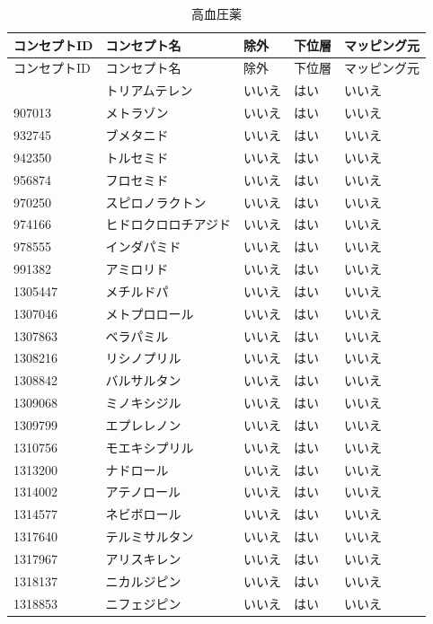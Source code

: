 \documentclass[
  11pt]{book}
\theoremstyle{definition}
\theoremstyle{definition}
\theoremstyle{definition}
\theoremstyle{definition}
\theoremstyle{remark}
\begin{document}
\begin{longtable}[]{@{}lllll@{}}
\caption{\label{tab:htnDrugsAceMono} 高血圧薬}\tabularnewline
\toprule\noalign{}
コンセプトID & コンセプト名 & 除外 & 下位層 & マッピング元 \\
\midrule\noalign{}
\endfirsthead
\toprule\noalign{}
コンセプトID & コンセプト名 & 除外 & 下位層 & マッピング元 \\
\midrule\noalign{}
\endhead
\bottomrule\noalign{}
\endlastfoot
904542 & トリアムテレン & いいえ & はい & いいえ \\
907013 & メトラゾン & いいえ & はい & いいえ \\
932745 & ブメタニド & いいえ & はい & いいえ \\
942350 & トルセミド & いいえ & はい & いいえ \\
956874 & フロセミド & いいえ & はい & いいえ \\
970250 & スピロノラクトン & いいえ & はい & いいえ \\
974166 & ヒドロクロロチアジド & いいえ & はい & いいえ \\
978555 & インダパミド & いいえ & はい & いいえ \\
991382 & アミロリド & いいえ & はい & いいえ \\
1305447 & メチルドパ & いいえ & はい & いいえ \\
1307046 & メトプロロール & いいえ & はい & いいえ \\
1307863 & ベラパミル & いいえ & はい & いいえ \\
1308216 & リシノプリル & いいえ & はい & いいえ \\
1308842 & バルサルタン & いいえ & はい & いいえ \\
1309068 & ミノキシジル & いいえ & はい & いいえ \\
1309799 & エプレレノン & いいえ & はい & いいえ \\
1310756 & モエキシプリル & いいえ & はい & いいえ \\
1313200 & ナドロール & いいえ & はい & いいえ \\
1314002 & アテノロール & いいえ & はい & いいえ \\
1314577 & ネビボロール & いいえ & はい & いいえ \\
1317640 & テルミサルタン & いいえ & はい & いいえ \\
1317967 & アリスキレン & いいえ & はい & いいえ \\
1318137 & ニカルジピン & いいえ & はい & いいえ \\
1318853 & ニフェジピン & いいえ & はい & いいえ \\

\end{longtable}
\end{document}
